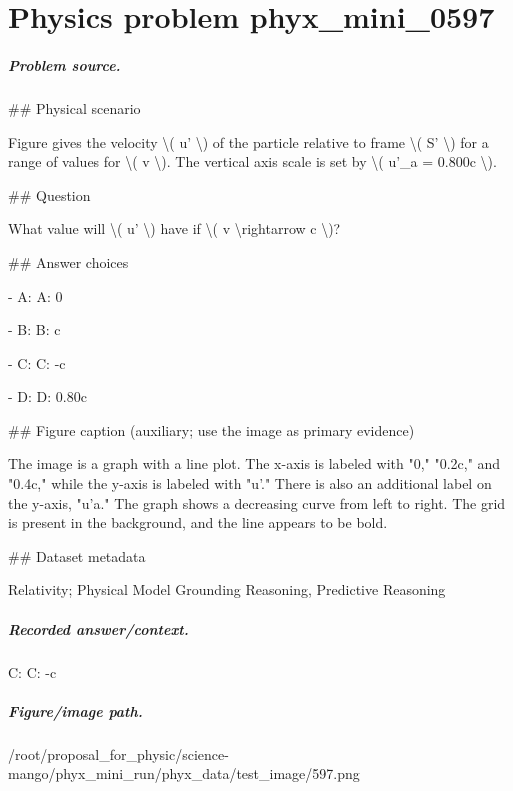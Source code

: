 
\chapter{Physics problem phyx\_mini\_0597}
\label{ch:PhyXMiniProblems_problem_phyx_mini_0597}

\paragraph{Problem source.}
\#\# Physical scenario

Figure gives the velocity \textbackslash{}( u' \textbackslash{}) of the particle relative to frame \textbackslash{}( S' \textbackslash{}) for a range of values for \textbackslash{}( v \textbackslash{}). The vertical axis scale is set by \textbackslash{}( u'\_a = 0.800c \textbackslash{}).

\#\# Question

What value will \textbackslash{}( u' \textbackslash{}) have if \textbackslash{}( v \textbackslash{}rightarrow c \textbackslash{})?

\#\# Answer choices

- A: A: 0

- B: B: c

- C: C: -c

- D: D: 0.80c

\#\# Figure caption (auxiliary; use the image as primary evidence)

The image is a graph with a line plot. The x-axis is labeled with "0," "0.2c," and "0.4c," while the y-axis is labeled with "u'." There is also an additional label on the y-axis, "u'a." The graph shows a decreasing curve from left to right. The grid is present in the background, and the line appears to be bold.

\#\# Dataset metadata

Relativity; Physical Model Grounding Reasoning, Predictive Reasoning

\paragraph{Recorded answer/context.}
C: C: -c

\paragraph{Figure/image path.}
/root/proposal\_for\_physic/science-mango/phyx\_mini\_run/phyx\_data/test\_image/597.png

